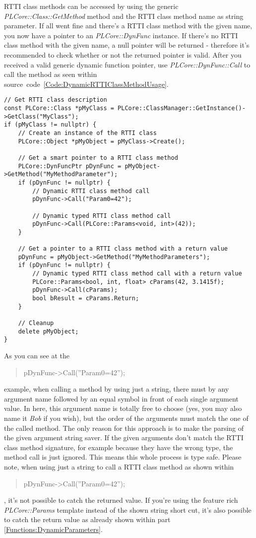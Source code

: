 RTTI class methods can be accessed by using the generic \emph{PLCore::Class::GetMethod} method and the RTTI class method name as string parameter. If all went fine and there's a RTTI class method with the given name, you now have a pointer to an \emph{PLCore::DynFunc} instance. If there's no RTTI class method with the given name, a null pointer will be returned - therefore it's recommended to check whether or not the returned pointer is valid. After you received a valid generic dynamic function pointer, use \emph{PLCore::DynFunc::Call} to call the method as seen within source~code~\ref{Code:DynamicRTTIClassMethodUsage}.
\begin{lstlisting}[label=Code:DynamicRTTIClassMethodUsage,caption={Dynamically calling RTTI class methods}]
// Get RTTI class description
const PLCore::Class *pMyClass = PLCore::ClassManager::GetInstance()->GetClass("MyClass");
if (pMyClass != nullptr) {
	// Create an instance of the RTTI class
	PLCore::Object *pMyObject = pMyClass->Create();

	// Get a smart pointer to a RTTI class method
	PLCore::DynFuncPtr pDynFunc = pMyObject->GetMethod("MyMethodParameter");
	if (pDynFunc != nullptr) {
		// Dynamic RTTI class method call
		pDynFunc->Call("Param0=42");

		// Dynamic typed RTTI class method call
		pDynFunc->Call(PLCore::Params<void, int>(42));
	}

	// Get a pointer to a RTTI class method with a return value
	pDynFunc = pMyObject->GetMethod("MyMethodParameters");
	if (pDynFunc != nullptr) {
		// Dynamic typed RTTI class method call with a return value
		PLCore::Params<bool, int, float> cParams(42, 3.1415f);
		pDynFunc->Call(cParams);
		bool bResult = cParams.Return;
	}

	// Cleanup
	delete pMyObject;
}
\end{lstlisting}
As you can see at the \begin{quote}pDynFunc->Call(''Param0=42'');\end{quote} example, when calling a method by using just a string, there must by any argument name followed by an equal symbol in front of each single argument value. In here, this argument name is totally free to choose (yes, you may also name it \emph{Bob} if you wish), but the order of the arguments must match the one of the called method. The only reason for this approach is to make the parsing of the given argument string saver. If the given arguments don't match the RTTI class method signature, for example because they have the wrong type, the method call is just ignored. This means this whole process is type safe. Please note, when using just a string to call a RTTI class method as shown within \begin{quote}pDynFunc->Call(''Param0=42'');\end{quote}, it's not possible to catch the returned value. If you're using the feature rich \emph{PLCore::Params} template instead of the shown string short cut, it's also possible to catch the return value as already shown within part \ref{Functions:DynamicParameters}.

